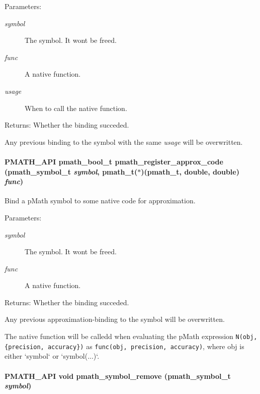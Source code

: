 \begin{Desc}
\item[Parameters:]
\begin{description}
\item[{\em symbol}]The symbol. It wont be freed. \item[{\em func}]A native function. \item[{\em usage}]When to call the native function. \end{description}
\end{Desc}
\begin{Desc}
\item[Returns:]Whether the binding succeded.\end{Desc}
Any previous binding to the symbol with the same {\em usage\/} will be overwritten. \hypertarget{group__symbols_gfb4f09c196d889a710c73d917ea0c12a}{
\paragraph[{pmath\_\-register\_\-approx\_\-code}]{\setlength{\rightskip}{0pt plus 5cm}PMATH\_\-API {\bf pmath\_\-bool\_\-t} pmath\_\-register\_\-approx\_\-code ({\bf pmath\_\-symbol\_\-t} {\em symbol}, \/  {\bf pmath\_\-t}($\ast$)({\bf pmath\_\-t}, double, double) {\em func})}\hfill}
\label{group__symbols_gfb4f09c196d889a710c73d917ea0c12a}


Bind a pMath symbol to some native code for approximation. 

\begin{Desc}
\item[Parameters:]
\begin{description}
\item[{\em symbol}]The symbol. It wont be freed. \item[{\em func}]A native function. \end{description}
\end{Desc}
\begin{Desc}
\item[Returns:]Whether the binding succeded.\end{Desc}
Any previous approximation-binding to the symbol will be overwritten.

The native function will be calledd when evaluating the pMath expression {\tt N(obj, \{precision, accuracy\})} as {\tt func(obj, precision, accuracy)}, where obj is either `symbol` or `symbol(...)`. \hypertarget{group__symbols_g78e6e98a2973c5e2b073b885269b12e4}{
\paragraph[{pmath\_\-symbol\_\-remove}]{\setlength{\rightskip}{0pt plus 5cm}PMATH\_\-API void pmath\_\-symbol\_\-remove ({\bf pmath\_\-symbol\_\-t} {\em symbol})}\hfill}
\label{group__symbols_g78e6e98a2973c5e2b073b885269b12e4}



